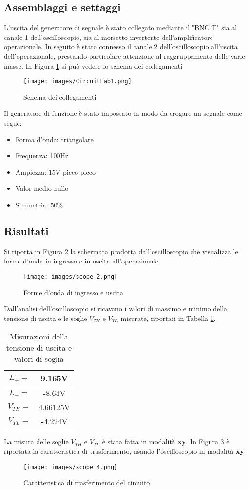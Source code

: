 \subsection{Assemblaggi e settaggi}
L'uscita del generatore di segnale è stato collegato mediante il "BNC T" sia al canale 1 dell'oscilloscopio, sia al morsetto invertente dell'amplificatore operazionale. In seguito è stato connesso il canale 2 dell'oscilloscopio all'uscita dell'operazionale, prestando particolare attenzione al raggruppamento delle varie masse. In Figura \ref{fig:CircuitLab} si può vedere lo schema dei collegamenti
\begin{figure}[H]
    \centering
    \texttt{[image: images/CircuitLab1.png]}
    \caption{Schema dei collegamenti}
    \label{fig:CircuitLab}
\end{figure}
Il generatore di funzione è stato impostato in modo da erogare un segnale come segue:
\begin{itemize}
    \item Forma d'onda: triangolare
    \item Frequenza: 100Hz
    \item Ampiezza: 15V picco-picco
    \item Valor medio nullo
    \item Simmetria: 50\%
\end{itemize}
\clearpage
\subsection{Risultati}
Si riporta in Figura \ref{fig:Osc1} la schermata prodotta dall'oscilloscopio che visualizza le forme d'onda in ingresso e in uscita all'operazionale
\begin{figure}[H]
    \centering
    \texttt{[image: images/scope\_2.png]}
    \caption{Forme d'onda di ingresso e uscita}
    \label{fig:Osc1}
\end{figure}
Dall'analisi dell'oscilloscopio si ricavano i valori di massimo e minimo della tensione di uscita e le soglie $V_{TH}$ e $V_{TL}$ misurate, riportati in Tabella \ref{tab:Ris1}.
\begin{table}[H]
    \centering
    \begin{tabular}{|c|c|}
        \hline
        $L_+=$&9.165V \\\hline
        $L_-=$&-8.64V \\\hline
        $V_{TH}=$&4.66125V \\\hline
        $V_{TL}=$&-4.224V \\\hline
    \end{tabular}
    \caption{Misurazioni della tensione di uscita e valori di soglia}
    \label{tab:Ris1}
\end{table}
La misura delle soglie $V_{TH}$ e $V_{TL}$ è stata fatta in modalità \textbf{xy}. In Figura \ref{fig:TrasfXY1} è riportata la caratteristica di trasferimento, usando l’oscilloscopio in modalità \textbf{xy} 
\begin{figure}[H]
    \centering
    \texttt{[image: images/scope\_4.png]}
    \caption{Caratteristica di trasferimento del circuito}
    \label{fig:TrasfXY1}
\end{figure}
\clearpage
